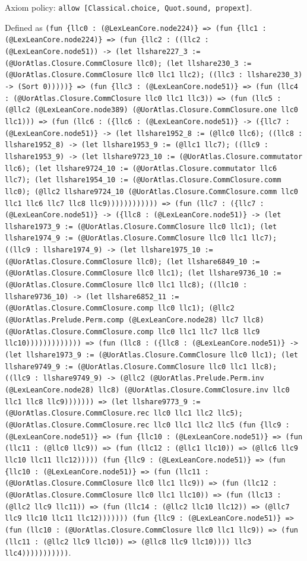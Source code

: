 \documentclass[11pt]{article}
\begin{document}
\noindent Axiom policy: \texttt{allow [Classical.choice, Quot.sound, propext]}.\par
\noindent Defined as \texttt{(fun \{llc0 : (@LexLeanCore.node224)\} => (fun \{llc1 : (@LexLeanCore.node224)\} => (fun \{llc2 : ((llc2 : (@LexLeanCore.node51)) -> (let llshare227\_3 := (@UorAtlas.Closure.CommClosure llc0); (let llshare230\_3 := (@UorAtlas.Closure.CommClosure llc0 llc1 llc2); ((llc3 : llshare230\_3) -> (Sort 0)))))\} => (fun \{llc3 : (@LexLeanCore.node51)\} => (fun (llc4 : (@UorAtlas.Closure.CommClosure llc0 llc1 llc3)) => (fun (llc5 : (@llc2 (@LexLeanCore.node389) (@UorAtlas.Closure.CommClosure.one llc0 llc1))) => (fun (llc6 : (\{llc6 : (@LexLeanCore.node51)\} -> (\{llc7 : (@LexLeanCore.node51)\} -> (let llshare1952\_8 := (@llc0 llc6); ((llc8 : llshare1952\_8) -> (let llshare1953\_9 := (@llc1 llc7); ((llc9 : llshare1953\_9) -> (let llshare9723\_10 := (@UorAtlas.Closure.commutator llc6); (let llshare9724\_10 := (@UorAtlas.Closure.commutator llc6 llc7); (let llshare1954\_10 := (@UorAtlas.Closure.CommClosure.comm llc0); (@llc2 llshare9724\_10 (@UorAtlas.Closure.CommClosure.comm llc0 llc1 llc6 llc7 llc8 llc9)))))))))))) => (fun (llc7 : (\{llc7 : (@LexLeanCore.node51)\} -> (\{llc8 : (@LexLeanCore.node51)\} -> (let llshare1973\_9 := (@UorAtlas.Closure.CommClosure llc0 llc1); (let llshare1974\_9 := (@UorAtlas.Closure.CommClosure llc0 llc1 llc7); ((llc9 : llshare1974\_9) -> (let llshare1975\_10 := (@UorAtlas.Closure.CommClosure llc0); (let llshare6849\_10 := (@UorAtlas.Closure.CommClosure llc0 llc1); (let llshare9736\_10 := (@UorAtlas.Closure.CommClosure llc0 llc1 llc8); ((llc10 : llshare9736\_10) -> (let llshare6852\_11 := (@UorAtlas.Closure.CommClosure.comp llc0 llc1); (@llc2 (@UorAtlas.Prelude.Perm.comp (@LexLeanCore.node28) llc7 llc8) (@UorAtlas.Closure.CommClosure.comp llc0 llc1 llc7 llc8 llc9 llc10))))))))))))) => (fun (llc8 : (\{llc8 : (@LexLeanCore.node51)\} -> (let llshare1973\_9 := (@UorAtlas.Closure.CommClosure llc0 llc1); (let llshare9749\_9 := (@UorAtlas.Closure.CommClosure llc0 llc1 llc8); ((llc9 : llshare9749\_9) -> (@llc2 (@UorAtlas.Prelude.Perm.inv (@LexLeanCore.node28) llc8) (@UorAtlas.Closure.CommClosure.inv llc0 llc1 llc8 llc9))))))) => (let llshare9773\_9 := (@UorAtlas.Closure.CommClosure.rec llc0 llc1 llc2 llc5); (@UorAtlas.Closure.CommClosure.rec llc0 llc1 llc2 llc5 (fun \{llc9 : (@LexLeanCore.node51)\} => (fun \{llc10 : (@LexLeanCore.node51)\} => (fun (llc11 : (@llc0 llc9)) => (fun (llc12 : (@llc1 llc10)) => (@llc6 llc9 llc10 llc11 llc12))))) (fun \{llc9 : (@LexLeanCore.node51)\} => (fun \{llc10 : (@LexLeanCore.node51)\} => (fun (llc11 : (@UorAtlas.Closure.CommClosure llc0 llc1 llc9)) => (fun (llc12 : (@UorAtlas.Closure.CommClosure llc0 llc1 llc10)) => (fun (llc13 : (@llc2 llc9 llc11)) => (fun (llc14 : (@llc2 llc10 llc12)) => (@llc7 llc9 llc10 llc11 llc12))))))) (fun \{llc9 : (@LexLeanCore.node51)\} => (fun (llc10 : (@UorAtlas.Closure.CommClosure llc0 llc1 llc9)) => (fun (llc11 : (@llc2 llc9 llc10)) => (@llc8 llc9 llc10)))) llc3 llc4)))))))))))}.\par
\end{document}
